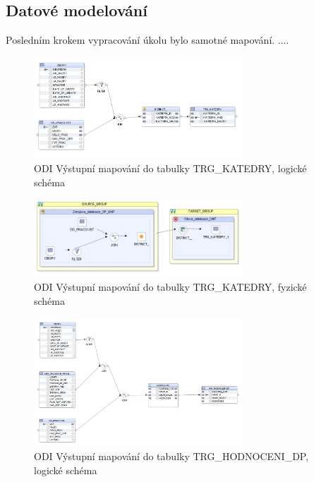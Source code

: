  \subsection{Datové modelování}
 Posledním krokem vypracování úkolu bylo samotné mapování. ....




\begin{figure}[htb]
    \centering
    \includegraphics[width=0.7\textwidth]{graphs/odi-mapping-trg-katedry.png}
    \caption{ODI Výstupní mapování do tabulky TRG\_KATEDRY, logické schéma}
    \label{fig:odi-mapping-trg-katedry}
\end{figure}
\FloatBarrier

\begin{figure}[htb]
    \centering
    \includegraphics[width=0.7\textwidth]{graphs/odi-mapping-trg-katedry-physical.png}
    \caption{ODI Výstupní mapování do tabulky TRG\_KATEDRY, fyzické schéma}
    \label{fig:odi-mapping-trg-katedry-physical}
\end{figure}
\FloatBarrier

\begin{figure}[htb]
    \centering
    \includegraphics[width=0.7\textwidth]{graphs/odi-mapping-trg-hodnoceni-dp.png}
    \caption{ODI Výstupní mapování do tabulky TRG\_HODNOCENI\_DP, logické schéma}
    \label{fig:odi-mapping-trg-hodnoceni}
\end{figure}
\FloatBarrier

